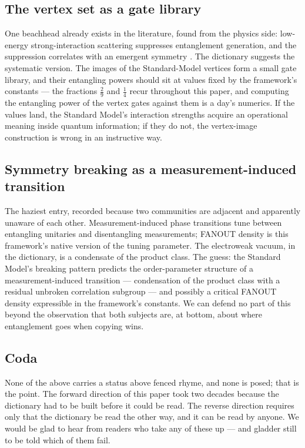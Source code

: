 \subsection{The vertex set as a gate library}
\label{app:rev-gates}

One beachhead already exists in the literature, found from the physics side: low-energy
strong-interaction scattering suppresses entanglement generation, and the suppression
correlates with an emergent symmetry \autocite{beane2019entanglement}. The dictionary
suggests the systematic version. The images of the Standard-Model vertices form a small
gate library, and their entangling powers \autocite{zanardizalkafaoro2000entangling}
should sit at values fixed by the framework's constants --- the fractions $\tfrac{2}{9}$
and $\tfrac14$ recur throughout this paper, and computing the entangling power of the
vertex gates against them is a day's numerics. If the values land, the Standard Model's
interaction strengths acquire an operational meaning inside quantum information; if they
do not, the vertex-image construction is wrong in an instructive way.

\subsection{Symmetry breaking as a measurement-induced transition}
\label{app:rev-mipt}

The haziest entry, recorded because two communities are adjacent and apparently unaware
of each other. Measurement-induced phase transitions \autocite{lichenfisher2018zeno,
skinnerruhmannahum2019measurement} tune between entangling unitaries and disentangling
measurements; FANOUT density is this framework's native version of the tuning parameter.
The electroweak vacuum, in the dictionary, is a condensate of the product class. The
guess: the Standard Model's breaking pattern predicts the order-parameter structure of a
measurement-induced transition --- condensation of the product class with a residual
unbroken correlation subgroup --- and possibly a critical FANOUT density expressible in
the framework's constants. We can defend no part of this beyond the observation that
both subjects are, at bottom, about where entanglement goes when copying wins.

\subsection*{Coda}

None of the above carries a status above fenced rhyme, and none is posed; that is the
point. The forward direction of this paper took two decades because the dictionary had
to be built before it could be read. The reverse direction requires only that the
dictionary be read the other way, and it can be read by anyone. We would be glad to hear
from readers who take any of these up --- and gladder still to be told which of them
fail.
